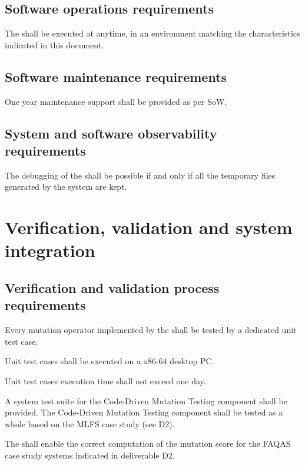 \section{Software operations requirements}

\RQ{} The \FAQAS shall be executed at anytime,
in an environment matching the characteristics indicated in this document.

\section{Software maintenance requirements}

\RQ{} One year maintenance support shall be provided as per SoW.

\section{System and software observability requirements}

\RQ{} The debugging of the \FAQAS shall be possible if and only if
all the temporary files generated by the system are kept.

\chapter{Verification, validation and system integration}
 \section{Verification and validation process requirements}

\RQ{} Every mutation operator implemented by the \FAQAS shall be tested by a dedicated unit test case.

\RQ{} Unit test cases shall be executed on a x86-64 desktop PC.

\RQ{} Unit test cases execution time shall not exceed one day.

\RQ{} A system test suite for the Code-Driven Mutation Testing component shall be provided. The Code-Driven Mutation Testing component shall be tested as a whole based on the MLFS case study (see D2).

 \RQ{} The \FAQAS shall enable the correct computation of the mutation score for the FAQAS case study systems indicated in deliverable D2.
 
 
